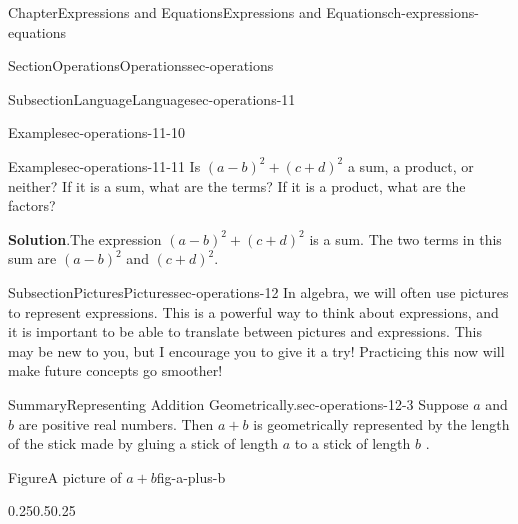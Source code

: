 \documentclass[twoside,11pt,]{book}
\newcommand{\blocktitlefont}{\relax}
\numberwithin{equation}{chapter}
\begin{document}
\begin{chapterptx}{Chapter}{Expressions and Equations}{}{Expressions and Equations}{}{}{ch-expressions-equations}
\begin{sectionptx}{Section}{Operations}{}{Operations}{}{}{sec-operations}
\begin{subsectionptx}{Subsection}{Language}{}{Language}{}{}{sec-operations-11}
\begin{example}{Example}{}{sec-operations-11-10}
\end{example}
\begin{example}{Example}{}{sec-operations-11-11}%
Is \((a-b)^2 + (c+d)^2\) a sum, a product, or neither? If it is a sum, what are the terms? If it is a product, what are the factors?%
\par\smallskip%
\noindent\textbf{\blocktitlefont Solution}.\hypertarget{sec-operations-11-11-2}{}\quad{}The expression \((a-b)^2 + (c+d)^2\) is a sum. The two terms in this sum are \((a-b)^2\) and \((c+d)^2\).%
\end{example}
\end{subsectionptx}
%
%
\typeout{************************************************}
\typeout{************************************************}
%
\begin{subsectionptx}{Subsection}{Pictures}{}{Pictures}{}{}{sec-operations-12}
In algebra, we will often use pictures to represent expressions. This is a powerful way to think about expressions, and it is important to be able to translate between pictures and expressions. This may be new to you, but I encourage you to give it a try! Practicing this now will make future concepts go smoother!%
\begin{assemblage}{Summary}{Representing Addition Geometrically.}{sec-operations-12-3}%
Suppose \(a\) and \(b\) are positive real numbers. Then \(a+b\) is geometrically represented by the length of the stick made by gluing a stick of length \(a\) to a stick of length \(b\) . \begin{figureptx}{Figure}{A picture of \(a+b\)}{fig-a-plus-b}{}%
\begin{image}{0.25}{0.5}{0.25}{}%
\end{image}
\end{figureptx}
\end{assemblage}
\end{subsectionptx}
\end{sectionptx}
\end{chapterptx}
\end{document}
